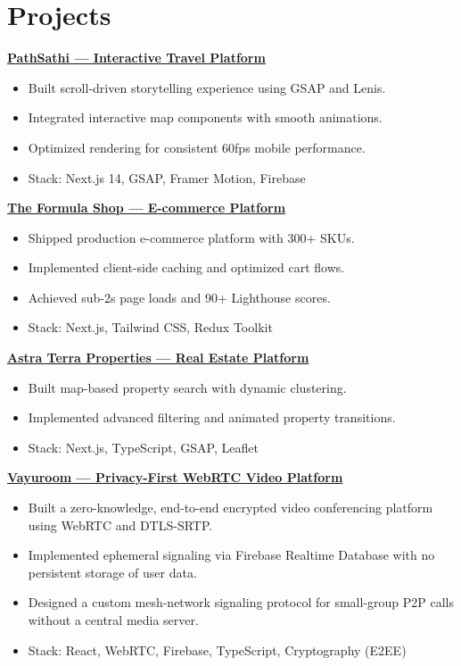 \documentclass[10pt, letterpaper]{article}
\newenvironment{tightitem}{
    \begin{itemize}[topsep=1pt, itemsep=0.5pt, parsep=0pt, leftmargin=10pt]
}{
    \end{itemize}
}
\begin{document}
\section{Projects}

\href{https://pathsathi.vercel.app/}{\textbf{PathSathi — Interactive Travel Platform}}  
\begin{tightitem}
\item Built scroll-driven storytelling experience using GSAP and Lenis.
\item Integrated interactive map components with smooth animations.
\item Optimized rendering for consistent 60fps mobile performance.
\item Stack: Next.js 14, GSAP, Framer Motion, Firebase
\end{tightitem}

\href{https://theformulashop.com/}{\textbf{The Formula Shop — E-commerce Platform}}  
\begin{tightitem}
\item Shipped production e-commerce platform with 300+ SKUs.
\item Implemented client-side caching and optimized cart flows.
\item Achieved sub-2s page loads and 90+ Lighthouse scores.
\item Stack: Next.js, Tailwind CSS, Redux Toolkit
\end{tightitem}

\href{https://www.astraterra.ae/}{\textbf{Astra Terra Properties — Real Estate Platform}}  
\begin{tightitem}
\item Built map-based property search with dynamic clustering.
\item Implemented advanced filtering and animated property transitions.
\item Stack: Next.js, TypeScript, GSAP, Leaflet
\end{tightitem}

\href{https://vayuroom.vercel.app/}{\textbf{Vayuroom — Privacy-First WebRTC Video Platform}}  
\begin{tightitem}
\item Built a zero-knowledge, end-to-end encrypted video conferencing platform using WebRTC and DTLS-SRTP.
\item Implemented ephemeral signaling via Firebase Realtime Database with no persistent storage of user data.
\item Designed a custom mesh-network signaling protocol for small-group P2P calls without a central media server.
\item Stack: React, WebRTC, Firebase, TypeScript, Cryptography (E2EE)
\end{tightitem}
\end{document}

